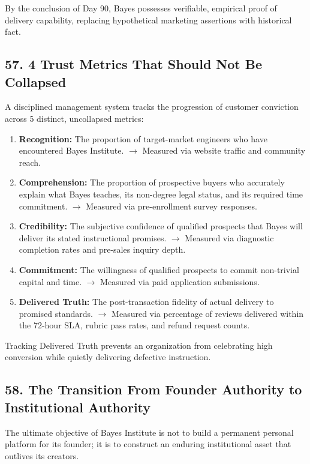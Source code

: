 By the conclusion of Day 90, Bayes possesses verifiable, empirical proof of delivery capability, replacing hypothetical marketing assertions with historical fact.

\subsection*{57. 4 Trust Metrics That Should Not Be Collapsed}

A disciplined management system tracks the progression of customer conviction across 5 distinct, uncollapsed metrics:
\begin{enumerate}
\item \textbf{Recognition:} The proportion of target-market engineers who have encountered Bayes Institute. $\rightarrow$ Measured via website traffic and community reach.
\item \textbf{Comprehension:} The proportion of prospective buyers who accurately explain what Bayes teaches, its non-degree legal status, and its required time commitment. $\rightarrow$ Measured via pre-enrollment survey responses.
\item \textbf{Credibility:} The subjective confidence of qualified prospects that Bayes will deliver its stated instructional promises. $\rightarrow$ Measured via diagnostic completion rates and pre-sales inquiry depth.
\item \textbf{Commitment:} The willingness of qualified prospects to commit non-trivial capital and time. $\rightarrow$ Measured via paid application submissions.
\item \textbf{Delivered Truth:} The post-transaction fidelity of actual delivery to promised standards. $\rightarrow$ Measured via percentage of reviews delivered within the 72-hour SLA, rubric pass rates, and refund request counts.
\end{enumerate}

Tracking Delivered Truth prevents an organization from celebrating high conversion while quietly delivering defective instruction.

\subsection*{58. The Transition From Founder Authority to Institutional Authority}

The ultimate objective of Bayes Institute is not to build a permanent personal platform for its founder; it is to construct an enduring institutional asset that outlives its creators. 


